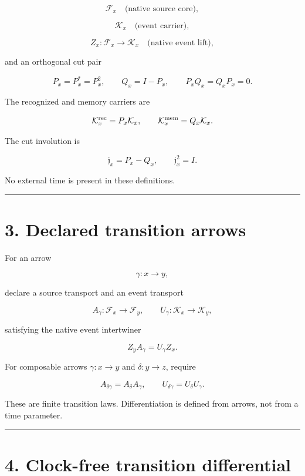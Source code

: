 \[
\mathcal F_x
\quad\text{(native source core)},
\]

\[
\mathcal K_x
\quad\text{(event carrier)},
\]

\[
Z_x:\mathcal F_x\longrightarrow\mathcal K_x
\quad\text{(native event lift)},
\]

and an orthogonal cut pair

\[
P_x=P_x^*=P_x^2,
\qquad
Q_x=I-P_x,
\qquad
P_xQ_x=Q_xP_x=0.
\]

The recognized and memory carriers are

\[
\mathcal K_x^{\rm rec}=P_x\mathcal K_x,
\qquad
\mathcal K_x^{\rm mem}=Q_x\mathcal K_x.
\]

The cut involution is

\[
\mathfrak j_x=P_x-Q_x,
\qquad
\mathfrak j_x^2=I.
\]

No external time is present in these definitions.

\begin{center}\rule{0.5\linewidth}{0.5pt}\end{center}

\hypertarget{declared-transition-arrows}{%
\section{3. Declared transition arrows}\label{declared-transition-arrows}}

For an arrow

\[
\gamma:x\longrightarrow y,
\]

declare a source transport and an event transport

\[
A_\gamma:\mathcal F_x\longrightarrow\mathcal F_y,
\qquad
U_\gamma:\mathcal K_x\longrightarrow\mathcal K_y,
\]

satisfying the native event intertwiner

\[
\boxed{Z_yA_\gamma=U_\gamma Z_x.}
\]

For composable arrows \(\gamma:x\to y\) and \(\delta:y\to z\), require

\[
A_{\delta\gamma}=A_\delta A_\gamma,
\qquad
U_{\delta\gamma}=U_\delta U_\gamma.
\]

These are finite transition laws. Differentiation is defined from arrows, not
from a time parameter.

\begin{center}\rule{0.5\linewidth}{0.5pt}\end{center}

\hypertarget{clock-free-transition-differential}{%
\section{4. Clock-free transition differential}\label{clock-free-transition-differential}}

